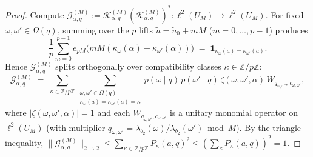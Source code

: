 \documentclass[11pt,a4paper]{article}
\numberwithin{equation}{section}
\theoremstyle{definition}
\theoremstyle{remark}
\newcommand{\Z}{\mathbb{Z}}
\newcommand{\cG}{\mathcal{G}}
\newcommand{\cK}{\mathcal{K}}
\begin{document}
\begin{proof}
Compute $\cG_{\alpha, q}^{(M)} := \cK_{\alpha, q}^{(M)}(\cK_{\alpha, q}^{(M)})^* : \ell^2(U_M) \to \ell^2(U_M)$. For fixed $\omega, \omega' \in \Omega(q)$, summing over the $p$ lifts $\tilde u = \tilde u_0 + mM$ ($m = 0, \dots, p-1$) produces
\[
\frac{1}{p}\sum_{m=0}^{p-1} e_{pM}\bigl(m M(\kappa_\omega(\alpha) - \kappa_{\omega'}(\alpha))\bigr) \;=\; \mathbf{1}_{\kappa_\omega(a) = \kappa_{\omega'}(a)}.
\]
Hence $\cG_{\alpha, q}^{(M)}$ splits orthogonally over compatibility classes $\kappa \in \Z/p\Z$:
\[
\cG_{\alpha, q}^{(M)} \;=\; \sum_{\kappa \in \Z/p\Z} \sum_{\substack{\omega, \omega' \in \Omega(q) \\ \kappa_\omega(a) = \kappa_{\omega'}(a) = \kappa}} p(\omega \mid q)\, p(\omega' \mid q)\, \zeta(\omega, \omega', \alpha)\, W_{q_{\omega, \omega'},\, c_{\omega, \omega'}},
\]
where $|\zeta(\omega, \omega', \alpha)| = 1$ and each $W_{q_{\omega, \omega'}, c_{\omega, \omega'}}$ is a unitary monomial operator on $\ell^2(U_M)$ (with multiplier $q_{\omega,\omega'} = \lambda_{b_2}(\omega)/\lambda_{b_2}(\omega') \bmod M$). By the triangle inequality, $\|\cG_{\alpha, q}^{(M)}\|_{2\to 2} \le \sum_{\kappa \in \Z/p\Z} P_\kappa(a, q)^2 \le (\sum_\kappa P_\kappa(a, q))^2 = 1$.
\end{proof}
\end{document}
